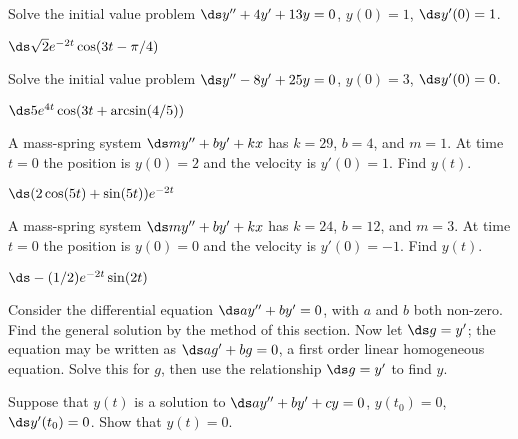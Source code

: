 \begin{enumialphparenastyle}
\begin{ex}
 Solve the initial value problem 
$\ds y''+4y'+13y=0$,
$y(0)=1$, $\ds y'(0)=1$. 
\begin{sol}
 $\ds \sqrt2 e^{-2t}\cos(3t-\pi/4)$
\end{sol}
\end{ex}


\begin{ex}
 Solve the initial value problem 
$\ds y''-8y'+25y=0$,
$y(0)=3$, $\ds y'(0)=0$. 
\begin{sol}
 $\ds 5e^{4t}\cos(3t+\arcsin(4/5))$
\end{sol}
\end{ex}


\begin{ex}
 A mass-spring system $\ds my''+by'+kx$ has
$k=29$, $b=4$, and $m=1$. At time $t=0$ the position is $y(0)=2$ and
the velocity is $y'(0)=1$. Find $y(t)$.
\begin{sol}
 $\ds (2\cos(5t)+\sin(5t))e^{-2t}$
\end{sol}
\end{ex}


\begin{ex}
 A mass-spring system $\ds my''+by'+kx$ has
$k=24$, $b=12$, and $m=3$. At time $t=0$ the position is $y(0)=0$ and
the velocity is $y'(0)=-1$. Find $y(t)$.
\begin{sol}
 $\ds-(1/2)e^{-2t}\sin(2t)$
\end{sol}
\end{ex}


\begin{ex}
 Consider 
the differential equation $\ds ay'' + by'=0$,
with $a$ and $b$ both non-zero. Find the general solution by the
method of this section. Now let $\ds g=y'$; the equation may be
written as $\ds ag'+bg=0$, a first order linear homogeneous
equation. Solve this for $g$, then use the relationship $\ds g=y'$ to
find $y$.
\end{ex}


\begin{ex}
 Suppose that $y(t)$ is a solution to $\ds ay''+by'+cy=0$, $y(t_0)=0$, $\ds y'(t_0)=0$. Show that $y(t)=0$.
\end{ex}

\end{enumialphparenastyle}